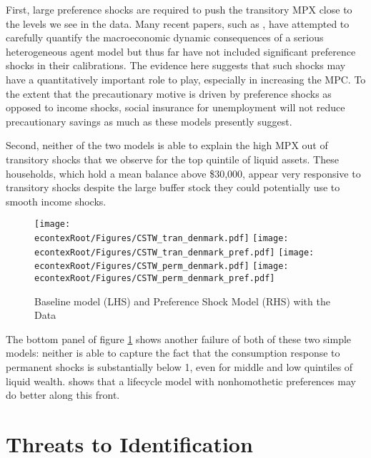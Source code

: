 \documentclass[titlepage]{\econtex}\newcommand{\texname}{ConsumptionHeterogeneity}
\begin{document}
First, large preference shocks are required to push the transitory MPX close to the levels we see in the data. Many recent papers, such as \cite{krueger_macroeconomics_2016}, have attempted to carefully quantify the macroeconomic dynamic consequences of a serious heterogeneous agent model but thus far have not included significant preference shocks in their calibrations. The evidence here suggests that such shocks may have a quantitatively important role to play, especially in increasing the MPC. To the extent that the precautionary motive is driven by preference shocks as opposed to income shocks, social insurance for unemployment will not reduce precautionary savings as much as these models presently suggest.

Second, neither of the two models is able to explain the high MPX out of transitory shocks that we observe for the top quintile of liquid assets. These households, which hold a mean balance above \$30,000, appear very responsive to transitory shocks despite the large buffer stock they could potentially use to smooth income shocks.
\begin{figure} 
	\begin{centering}
		\texttt{[image: \\econtexRoot/Figures/CSTW\_tran\_denmark.pdf]}
		\texttt{[image: \\econtexRoot/Figures/CSTW\_tran\_denmark\_pref.pdf]}
		\texttt{[image: \\econtexRoot/Figures/CSTW\_perm\_denmark.pdf]}
\texttt{[image: \\econtexRoot/Figures/CSTW\_perm\_denmark\_pref.pdf]}
		\caption{Baseline model (LHS) and Preference Shock Model (RHS) with the Data}
		\label{fig:CSTW}
	\end{centering}
\end{figure}

The bottom panel of figure \ref{fig:CSTW} shows another failure of both of these two simple models: neither is able to capture the fact that the consumption response to permanent shocks is substantially below 1, even for middle and low quintiles of liquid wealth. \cite{straub_consumption_2018} shows that a lifecycle model with nonhomothetic preferences may do better along this front.

\section{Threats to Identification}
\label{threats_to_identification}
\end{document}
